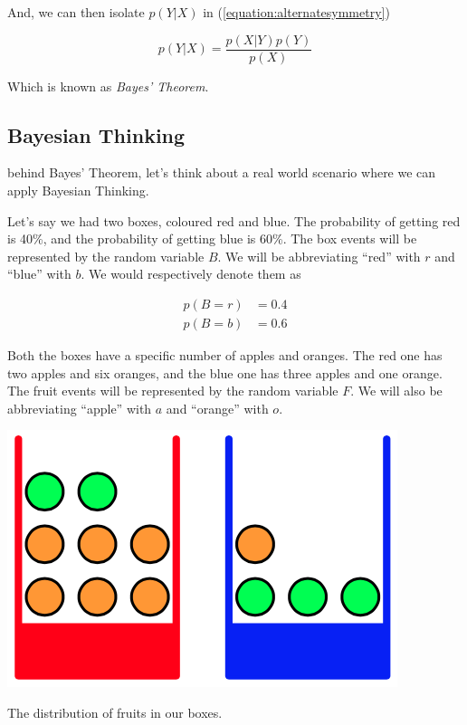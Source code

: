 \documentclass{tufte-handout}
\begin{document}
And, we can then isolate $p(Y|X)$ in (\ref{equation:alternatesymmetry})

\begin{equation}
  p(Y|X) = \frac{p(X|Y)p(Y)}{p(X)}
\end{equation}

Which is known as \emph{Bayes' Theorem}.

\subsection{Bayesian Thinking}

 behind Bayes' Theorem, let's think about a
real world scenario where we can apply Bayesian Thinking.

Let's say we had two boxes, coloured red and blue. The probability of getting
red is 40\%, and the probability of getting blue is 60\%. The box events will
be represented by the random variable $B$. We will be abbreviating ``red'' with
$r$ and ``blue'' with $b$. We would respectively denote them as

\begin{align}
  p(B = r) &= 0.4 \\
  p(B = b) &= 0.6
\end{align}

Both the boxes have a specific number of apples and oranges. The red one has
two apples and six oranges, and the blue one has three apples and one orange.
The fruit events will be represented by the random variable $F$. We will also
be abbreviating ``apple'' with $a$ and ``orange'' with $o$.

\begin{marginfigure}
  \includegraphics[width=\linewidth]{fruitboxes.png}
  \caption{The distribution of fruits in our boxes.}
\end{marginfigure}
\end{document}

